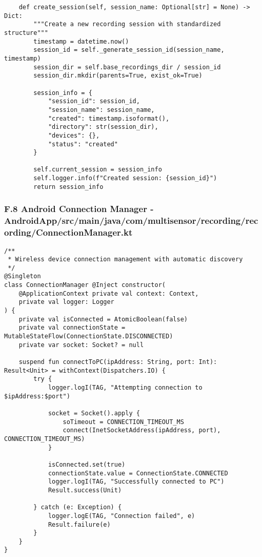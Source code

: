 \documentclass[12pt,a4paper]{report}
\begin{document}
{{\begin{verbatim}
    def create_session(self, session_name: Optional[str] = None) -> Dict:
        """Create a new recording session with standardized structure"""
        timestamp = datetime.now()
        session_id = self._generate_session_id(session_name, timestamp)
        session_dir = self.base_recordings_dir / session_id
        session_dir.mkdir(parents=True, exist_ok=True)

        session_info = {
            "session_id": session_id,
            "session_name": session_name,
            "created": timestamp.isoformat(),
            "directory": str(session_dir),
            "devices": {},
            "status": "created"
        }

        self.current_session = session_info
        self.logger.info(f"Created session: {session_id}")
        return session_info
\end{verbatim}

\subsubsection{F.8 Android Connection Manager - AndroidApp/src/main/java/com/multisensor/recording/recording/ConnectionManager.kt}

\begin{verbatim}
/**
 * Wireless device connection management with automatic discovery
 */
@Singleton
class ConnectionManager @Inject constructor(
    @ApplicationContext private val context: Context,
    private val logger: Logger
) {
    private val isConnected = AtomicBoolean(false)
    private val connectionState = MutableStateFlow(ConnectionState.DISCONNECTED)
    private var socket: Socket? = null

    suspend fun connectToPC(ipAddress: String, port: Int): Result<Unit> = withContext(Dispatchers.IO) {
        try {
            logger.logI(TAG, "Attempting connection to $ipAddress:$port")

            socket = Socket().apply {
                soTimeout = CONNECTION_TIMEOUT_MS
                connect(InetSocketAddress(ipAddress, port), CONNECTION_TIMEOUT_MS)
            }

            isConnected.set(true)
            connectionState.value = ConnectionState.CONNECTED
            logger.logI(TAG, "Successfully connected to PC")
            Result.success(Unit)

        } catch (e: Exception) {
            logger.logE(TAG, "Connection failed", e)
            Result.failure(e)
        }
    }
}
\end{verbatim}

}}
\end{document}
